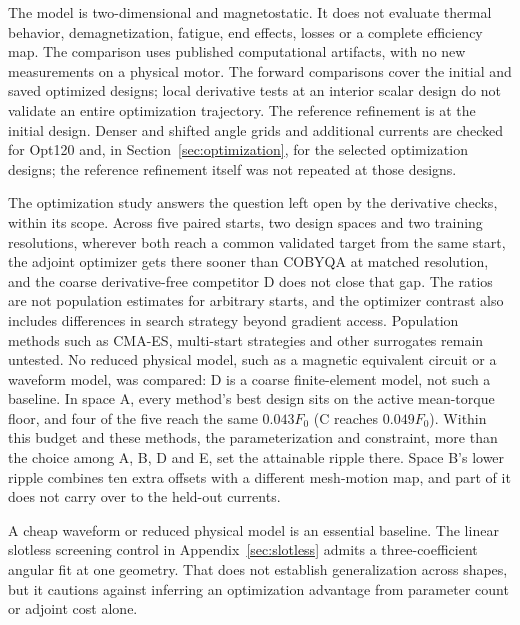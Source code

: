 \documentclass{anvil-paper}
\begin{document}
The model is two-dimensional and magnetostatic. It does not evaluate
thermal behavior, demagnetization, fatigue, end effects, losses or a
complete efficiency map. The comparison uses published computational
artifacts, with no new measurements on a physical motor. The forward comparisons cover the initial and saved optimized designs;
local derivative tests at an interior scalar design do not validate an
entire optimization trajectory. The reference refinement is at the initial
design. Denser and shifted angle grids and additional currents are checked
for Opt120 and, in Section~\ref{sec:optimization}, for the selected
optimization designs; the reference refinement itself was not repeated at
those designs.

The optimization study answers the question left open by the derivative
checks, within its scope. Across five paired starts, two design spaces and
two training resolutions, wherever both reach a common validated target
from the same start, the adjoint optimizer gets there sooner than COBYQA at
matched resolution, and the coarse
derivative-free competitor D does not close that gap. The ratios are not
population estimates for arbitrary starts, and the optimizer contrast also
includes differences in search strategy beyond gradient access.
Population methods such as CMA-ES, multi-start strategies and other
surrogates remain untested. No reduced physical model, such as a magnetic
equivalent circuit or a waveform model, was compared: D is a coarse
finite-element model, not such a baseline. In space A, every method's best
design sits on the active mean-torque floor, and four of the five reach
the same $0.043F_0$ (C reaches $0.049F_0$). Within this budget and these
methods, the parameterization and constraint, more than the choice among
A, B, D and E, set the attainable ripple there. Space B's lower ripple
combines ten extra offsets with a different mesh-motion map, and part of
it does not carry over to the held-out currents.

A cheap waveform or reduced physical model is an essential baseline.
The linear slotless screening control in Appendix~\ref{sec:slotless}
admits a three-coefficient angular fit at one geometry. That does not
establish generalization across shapes, but it cautions against inferring
an optimization advantage from parameter count or adjoint cost alone.
\end{document}
